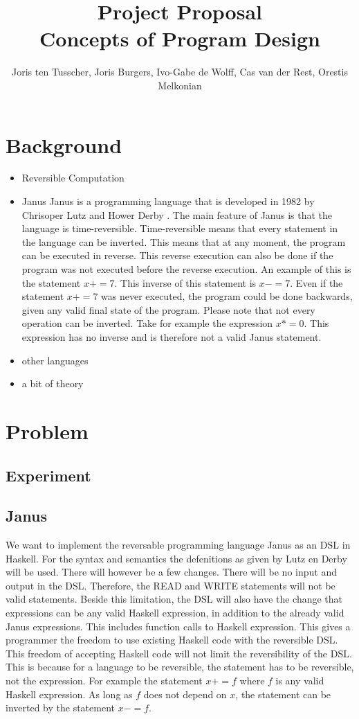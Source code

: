 \documentclass[12pt,a4paper]{article}
\title{\textbf{Project Proposal \\ \small{Concepts of Program Design}}}
\author{\small{Joris ten Tusscher, Joris Burgers, Ivo-Gabe de Wolff, Cas van der Rest, Orestis Melkonian}}
\date{}
\begin{document}
\maketitle

\section{Background}
\begin{itemize}
	\item{Reversible Computation}
	\item{Janus}
		Janus is a programming language that is developed in 1982 by Chrisoper Lutz and Hower Derby \cite{r:lutz-derby1982}. The main feature of Janus is that the language is time-reversible. Time-reversible means that every statement in the language can be inverted. This means that at any moment, the program can be executed in reverse. This reverse execution can also be done if the program was not executed before the reverse execution. An example of this is the statement $x+=7$. This inverse of this statement is $x-=7$. Even if the statement $x+=7$ was never executed, the program could be done backwards, given any valid final state of the program. Please note that not every operation can be inverted. Take for example the expression $x*=0$. This expression has no inverse and is therefore not a valid Janus statement.
	\item{other languages}
	\item{a bit of theory}
\end{itemize}

\section{Problem}
	\subsection{Experiment}
	
	\subsection{Janus}
	We want to implement the reversable programming language Janus as an DSL in Haskell. For the syntax and semantics the defenitions as given by Lutz en Derby \cite{r:lutz-derby1982} will be used. There will however be a few changes. There will be no input and output in the DSL. Therefore, the READ and WRITE statements will not be valid statements. Beside this limitation, the DSL will also have the change that expressions can be any valid Haskell expression, in addition to the already valid Janus expressions. This includes function calls to Haskell expression. This gives a programmer the freedom to use existing Haskell code with the reversible DSL. This freedom of accepting Haskell code will not limit the reversibility of the DSL. This is because for a language to be reversible, the statement has to be reversible, not the expression. For example the statement $x += f$ where $f$ is any valid Haskell expression. As long as $f$ does not depend on $x$, the statement can be inverted by the statement $x -= f$.
	
\end{document}
